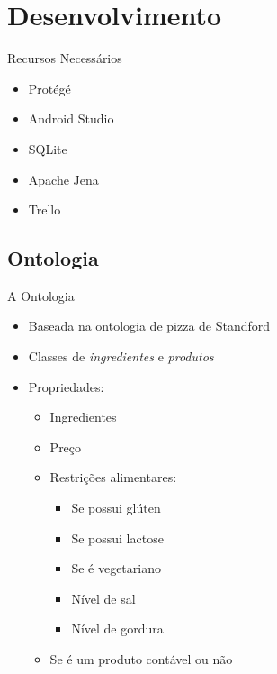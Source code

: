 \section{Desenvolvimento}\label{sec:desenvolvimento}

\begin{frame}{Recursos Necessários}
	\begin{itemize}
		\setlength{\itemsep}{1em}
		\item<1-> Protégé
		\item<1-> Android Studio
		\item<1-> SQLite
		\item<1-> Apache Jena
		\item<1-> Trello
	\end{itemize}
\end{frame}

\subsection{Ontologia}
\begin{frame}{A Ontologia}
	\begin{itemize}
		\setlength{\itemsep}{1em}
		\item<1-> Baseada na ontologia de pizza de Standford
		\item<1-> Classes de \textit{ingredientes} e \textit{produtos}
		\item<1-> Propriedades:
		\begin{itemize}
			\setlength{\itemsep}{0.5em}
			\item<1-> Ingredientes
			\item<1-> Preço
			\item<1-> Restrições alimentares: \\ 
			\vspace{-0.5em}
			\begin{minipage}[t]{0.4\linewidth}
				\begin{itemize}
					\setlength{\itemsep}{0.5em}
					\item<1-> Se possui glúten
					\item<1-> Se possui lactose
					\item<1-> Se é vegetariano	
				\end{itemize}
			\end{minipage}
			\begin{minipage}[t]{0.4\linewidth}
				\begin{itemize}
					\setlength{\itemsep}{0.5em}
					\item<1-> Nível de sal
					\item<1-> Nível de gordura			
				\end{itemize}
			\end{minipage}
			\item<1-> Se é um produto contável ou não
		\end{itemize}
	\end{itemize}
\end{frame}

